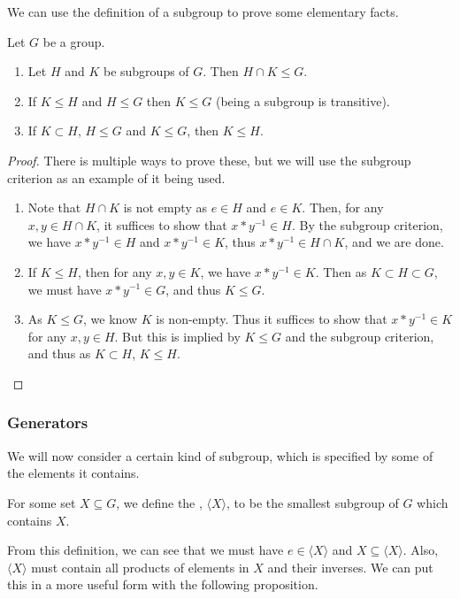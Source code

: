 \documentclass[a4paper]{scrartcl}
\newcommand{\newsubsection}{\subsubsection}
\begin{document}
We can use the definition of a subgroup to prove some elementary facts.
\begin{proposition}
	Let $G$ be a group.
	\begin{enumerate}[label=(\roman*)]
		\item Let $H$ and $K$ be subgroups of $G$. Then $H \cap K \leq G$.
		\item If $K \leq H$ and $H \leq G$ then $K \leq G$ (being a subgroup is transitive).
		\item If $K \subset H$, $H \leq G$ and $K \leq G$, then $K \leq H$. 
	\end{enumerate}
\end{proposition}
\begin{proof} There is multiple ways to prove these, but we will use the subgroup criterion as an example of it being used.\phantom{\qedhere}
	\begin{enumerate}[label=(\roman*)]
		\item Note that $H \cap K$ is not empty as $e \in H$ and $e \in K$. Then, for any $x, y \in H \cap K$, it suffices to show that $x * y^{-1} \in H$. By the subgroup criterion, we have $x * y^{-1} \in H$ and $x*y^{-1} \in K$, thus $x * y^{-1} \in H \cap K$, and we are done.
		\item If $K \leq H$, then for any $x, y \in K$, we have $x * y^{-1} \in K$. Then as $K \subset H \subset G$, we must have $x * y^{-1} \in G$, and thus $K \leq G$.
		\item As $K \leq G$, we know $K$ is non-empty. Thus it suffices to show that $x * y^{-1} \in K$ for any $x, y \in H$. But this is implied by $K \leq G$ and the subgroup criterion, and thus as $K \subset H$, $K \leq H$. \hfill \qedsymbol
	\end{enumerate}
\end{proof}

\newsubsection{Generators}

We will now consider a certain kind of subgroup, which is specified by some of the elements it contains.

\begin{definition}
	For some set $X \subseteq G$, we define the , $\langle X \rangle$, to be the smallest subgroup of $G$ which contains $X$.
\end{definition}

From this definition, we can see that we must have $e \in \langle X \rangle$ and $X \subseteq \langle X\rangle$. Also, $\langle X \rangle$ must contain all products of elements in $X$ and their inverses.
We can put this in a more useful form with the following proposition.
\end{document}
